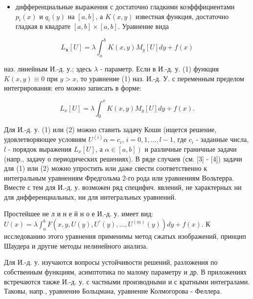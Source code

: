 \documentclass[10pt]{article}
\begin{document}
\begin{itemize}

  \item дифференциальные выражения с достаточно гладкими коэфффициентами $p_{i}(x)$ и $q_{i}(y)$ на $[a, b]$, а $K(x, y)$ известная функция, достаточно гладкая в квадрате $[a, b] \times[a, b]$. Уравнение вида

\end{itemize}



\[

L_{\boldsymbol{x}}[U]=\lambda \int_{a}^{b} K(x, y) M_{y}[U] d y+f(x)

\]



наз. линейным И.-д. у.; здесь $\lambda$ - параметр. Если в И.-д. у. (1) функция $K(x, y) \equiv 0$ при $y>x$, то уравнение (1) наз. И.-д. У. с переменным пределом интегрирования: его можно записать в форме:



\[

L_{x}[U]=\lambda \int_{0}^{x} K(x, y) M_{y}[U] d y+f(x) .

\]



Для И.-д. у. (1) или (2) можно ставить задачу Коши (ищется решение, удовлетворяющее условиям $U^{(i)} \alpha=c_{i}$, $i=0,1, \ldots, l-1$, где $c_{i}$ - заданные числа, $l$ - порядок выражения $L_{x}[U]$, а $\left.\alpha \in[a, b]\right)$ и различные граничные задачи (напр., задачу о периодических решениях). В ряде случаев (см. [3] - [4]) задачи для (1) или (2) можно упростить или даже свести соответственно к интегральным уравнениям Фредгольма 2-го рода или уравнениям Вольтерра. Вместе с тем для И.-д. у. возможен ряд специфич. явлений, не характерных ни для дифференциальных, ни для интегральных уравнений.



Простейшее не л и н е й н о е И.-д. у. имеет вид: $U(x)=\lambda \int_{a}^{b} F\left(x, y, U(y), U^{\prime}(y), \ldots, U^{(m)}(y)\right) d y+f(x)$. К исследованию этого уравнения применимы метод сжатых изображений, принцип Шаудера и другие методы нелинейного анализа.



Для И.-д. у. изучаются вопросы устойчивости решений, разложения по собственным функциям, асимптотика по малому параметру и др. В приложениях встречаются также И.-д. у. с частными производными и с кратными интегралами. Таковы, напр., уравнениө Больцмана, уравнение Колмогорова - Феллера.
\end{document}
